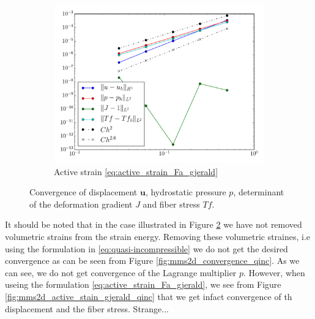 \documentclass[a4paper,10pt]{article}
\newcommand{\uvec}{\mathbf{u}}
\begin{document}
\begin{figure}[htbp]
\begin{subfigure}[t]{0.3\textwidth}
    \includegraphics[width=\textwidth]{figures/mms2d_active_strain}
    \caption{\label{fig:mms2d_active_stain_gjerald}Active strain \eqref{eq:active_strain_Fa_gjerald} }    
\end{subfigure}
\label{fig:mms2d_convergence_inc}
\caption{Convergence of displacement $\uvec$, hydrostatic pressure $p$, determinant of the deformation gradient $J$ and fiber stress $Tf$.}  
\end{figure}

It should be noted that in the case illustrated in Figure \ref{fig:mms2d_convergence_inc} we have not removed volumetric strains
from the strain energy. Removing these volumetric straines, i.e using the formulation in \eqref{eq:quasi-incompressible}
we do not get the desired convergence as can be seen from Figure \ref{fig:mms2d_convergence_qinc}. As we can see, we do not get convergence of the Lagrange multiplier $p$. However, when useing the formulation \eqref{eq:active_strain_Fa_gjerald}, we see from Figure \ref{fig:mms2d_active_stain_gjerald_qinc} that we get infact convergence of th displacement and the fiber stress. Strange...
\end{document}
